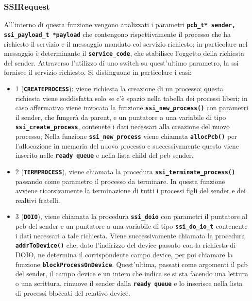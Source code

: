 \documentclass{article}
\begin{document}
\subsubsection{SSIRequest}
All'interno di questa funzione vengono analizzati i parametri \texttt{\textbf{pcb\_t* sender, ssi\_payload\_t *payload}} che contengono rispettivamente il processo che ha richiesto il servizio e il messaggio mandato col servizio richiesto; in particolare nel messaggio è determinante il \texttt{\textbf{service\_code}}, che stabilisce l'oggetto della richiesta del sender. Attraverso l'utilizzo di uno switch su quest'ultimo parametro, la ssi fornisce il servizio richiesto.
Si distinguono in particolare i casi:
\begin{itemize}
	\item 1 (\texttt{\textbf{CREATEPROCESS}}): viene richiesta la creazione di un processo; questa richiesta viene soddisfatta solo se c'è spazio nella tabella dei processi liberi; in caso affermativo viene invocata la funzione \texttt{\textbf{ssi\_new\_process()}} con parametri il sender, che fungerà da parent, e un puntatore a una variabile di tipo \texttt{\textbf{ssi\_create\_process}}, contenete i dati necessari alla creazione del nuovo processo; 
   Nella funzione \texttt{\textbf{ssi\_new\_process}} viene chiamata \texttt{\textbf{allocPcb()}} per l'allocazione in memoria del nuovo processo e successivamente questo viene inserito nelle \texttt{\textbf{ready queue}} e nella lista child del pcb sender.
   

    \item 2 (\texttt{\textbf{TERMPROCESS}}), viene chiamata la procedura \texttt{\textbf{ssi\_terminate\_process()}} passando come parametro il processo da terminare.
    In questa funzione avviene ricorsivamente la terminazione di tutti i processi figli del sender e dei realtivi fratelli.

    \item 3 (\texttt{\textbf{DOIO}}), viene chiamata la procedura \texttt{\textbf{ssi\_doio}} con parametri il puntatore al pcb del sender e un puntatore a una variabile di tipo \texttt{\textbf{ssi\_do\_io\_t}} contenente i dati necessari a tale richiesta.
    Viene successivamente chiamata la procedura \texttt{\textbf{addrToDevice()}} che, dato l'indirizzo del device passato con la richiesta di DOIO, ne determina il corrispondente campo device, per poi chiamare la funzione \texttt{\textbf{blockProcessOnDevice}}.
    Quest'ultima, passati come argomenti il pcb del sender, il campo device e un intero che indica se si sta facendo una lettura o una scrittura, rimuove il sender dalla \texttt{\textbf{ready queue}} e lo inserisce nella lista di processi bloccati del relativo device.


\end{itemize}
\end{document}

